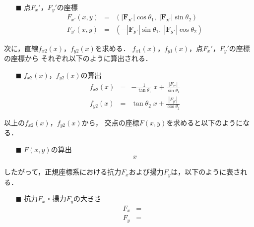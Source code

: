 \documentclass[twocolumn,a4j]{jsarticle}
\begin{document}
\begin{itemize}
    \item [$\blacksquare$] 点$F_x'$，$F_y'$の座標
          \begin{eqnarray*}
              F_{x'} \left(x ,y\right) &=& \left(|\boldsymbol{F_{x'}}| \cos \theta_1,\; |\boldsymbol{F_{x'}}| \sin \theta_2\right)\\
              F_{y'} \left(x ,y\right) &=& \left( - |\boldsymbol{F_{y'}}| \sin \theta_1,\; |\boldsymbol{F_{y'}}| \cos \theta_2\right)
          \end{eqnarray*}
\end{itemize}

次に，直線$f_{x2}\left(x\right)$，$f_{y2}\left(x\right)$を求める．
$f_{x1}\left(x\right)$，$f_{y1}\left(x\right)$，点$F_x'$，$F_y'$の座標の座標から
それぞれ以下のように算出される．

\begin{itemize}
    \item [$\blacksquare$] $f_{x2}\left(x\right)$，$f_{y2}\left(x\right)$の算出
          \begin{eqnarray*}
              f_{x2}\left(x\right) &=& - \frac{1}{\tan \theta_1} \; x + \frac{|F_{x'}|}{\sin \theta_1}\\
              f_{y2}\left(x\right) &=& \tan \theta_2\; x + \frac{|F_{y'}|}{\cos \theta_2}
          \end{eqnarray*}
\end{itemize}

以上の$f_{x2}\left(x\right)$，$f_{y2}\left(x\right)$から，
交点の座標$F\left(x,y\right)$を求めると以下のようになる．

\begin{itemize}
    \item [$\blacksquare$] $F\left(x,y\right)$の算出
          \begin{eqnarray*}
              x
          \end{eqnarray*}
\end{itemize}

したがって，正規座標系における抗力$F_x$および揚力$F_y$は，以下のように表される．

\begin{itemize}
    \item [$\blacksquare$] 抗力$F_x$・揚力$F_y$の大きさ
          \begin{eqnarray*}
              F_x &=& \\
              F_y &=&
          \end{eqnarray*}
\end{itemize}
\end{document}

